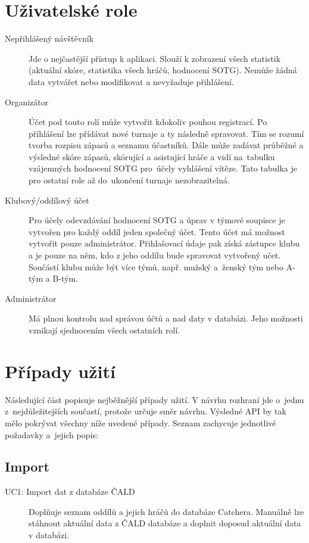\section{Uživatelské role}

\begin{description}
  \item[Nepřihlášený návštěvník]
    Jde o nejčastější přístup k aplikaci. Slouží k zobrazení všech statistik (aktuální skóre,
    statistika všech hráčů, hodnocení SOTG). Nemůže žádná data vytvářet nebo modifikovat
    a nevyžaduje přihlášení.
  \item[Organizátor]
    Účet pod touto rolí může vytvořit kdokoliv pouhou registrací. Po příhlášení lze přídávat
    nové turnaje a ty následně spravovat. Tím se rozumí tvorba rozpisu zápasů a seznamu účastníků.
    Dále může zadávat průběžné a výsledné skóre zápasů, skórující a asistující hráče a vidí
    na~tabulku vzájemných hodnocení SOTG pro~účely vyhlášení vítěze.
    Tato tabulka je pro ostatní role až do~ukončení turnaje nezobrazitelná.
  \item[Klubový/oddílový účet]
    Pro účely odevzdávání hodnocení SOTG a úprav v týmové soupisce je vytvořen pro každý oddíl
    jeden společný účet. Tento účet má možnost vytvořit pouze administrátor. Přihlašovací údaje pak
    získá zástupce klubu a je pouze na něm, kdo z jeho oddílu bude spravovat vytvořený učet.
    Součástí klubu může být více týmů, např. mužský a~ženský tým nebo A-tým a B-tým.
  \item[Administrátor]
    Má plnou kontrolu nad správou účtů a nad daty v databázi.
    Jeho možnosti vznikají sjednocením všech ostatních rolí.
\end{description}

\section{Případy užití}
\label{sec:use_case}

Následující část popisuje nejběžnější případy užití. V návrhu rozhraní jde
o~jednu z~nejdůležitejších součastí, protože určuje směr návrhu. Výsledné API by tak mělo
pokrývat všechny níže uvedené případy. Seznam zachycuje jednotlivé požadavky
a~jejich popis:

\subsection*{Import}
  \begin{description}
    \item[UC1: Import dat z databáze ČALD]
      Doplňuje seznam oddílů a jejich hráčů do databáze Catchera. Manuálně lze stáhnout
      aktuální data z ČALD databáze a doplnit doposud aktuální data v databázi.
  \end{description}

